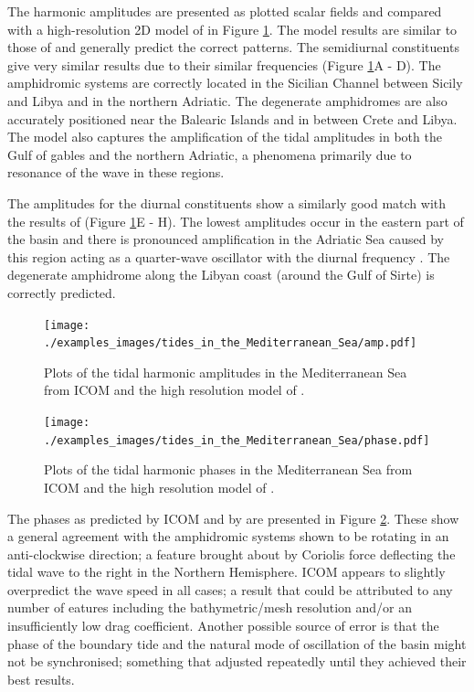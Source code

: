 The harmonic amplitudes are presented as plotted scalar fields and compared with a high-resolution 2D model of \citet{Tsimplis1995} in
Figure \ref{amp}. The model results are similar to those of \citet{Tsimplis1995} and generally predict the correct patterns. 
The semidiurnal constituents give very similar results due to their similar frequencies (Figure \ref{amp}A - D). The amphidromic
systems are correctly located in the Sicilian Channel between Sicily and Libya     
and in the northern Adriatic. The degenerate amphidromes are also accurately positioned near the Balearic Islands and in between
Crete and Libya. The model also captures the amplification of the tidal amplitudes in both the Gulf of gables and the northern Adriatic, 
a phenomena primarily due to resonance of the wave in these regions.

The amplitudes for the diurnal constituents show a similarly good match with the results of \citet{Tsimplis1995} (Figure \ref{amp}E - H).
The lowest amplitudes occur in the eastern part of the basin and there is pronounced amplification in the Adriatic Sea caused by this region
acting as a quarter-wave oscillator with the diurnal frequency \citep{Wells2008}. The degenerate amphidrome
along the Libyan coast (around the Gulf of Sirte) is correctly predicted.   

\begin{figure}[t!]
\centering
\texttt{[image: ./examples\_images/tides\_in\_the\_Mediterranean\_Sea/amp.pdf]}
\caption{Plots of the tidal harmonic amplitudes in the Mediterranean Sea from ICOM and the high resolution
model of \citet{Tsimplis1995}.}
\label{amp}
\end{figure}

\begin{figure}[t!]
\centering
\texttt{[image: ./examples\_images/tides\_in\_the\_Mediterranean\_Sea/phase.pdf]}
\caption{Plots of the tidal harmonic phases in the Mediterranean Sea from ICOM and the high resolution
model of \citet{Tsimplis1995}. } 
\label{phase}
\end{figure}

The phases as predicted by ICOM and by \citet{Tsimplis1995} are presented in Figure \ref{phase}. These show
a general agreement with the amphidromic systems shown to be rotating in an anti-clockwise direction; a feature
brought about by Coriolis force deflecting the tidal wave to the right in the Northern Hemisphere.
ICOM appears to slightly overpredict the wave speed in all cases; a result that could be attributed to any number of eatures including the
bathymetric/mesh resolution and/or an insufficiently low drag coefficient. Another possible source of error is that the
phase of the boundary tide and the natural mode of oscillation of the basin might not be synchronised; something that
\citet{Tsimplis1995} adjusted repeatedly until they achieved their best results.
 

